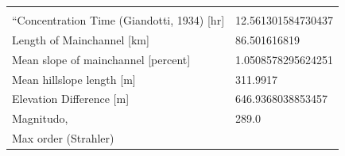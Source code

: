 \documentclass[11pt,]{article}
\begin{document}
\begin{longtable}[]{@{}ll@{}}
\begin{minipage}[t]{0.28\columnwidth}
\end{minipage}\tabularnewline
\begin{minipage}[t]{0.66\columnwidth}\raggedright\strut
``Concentration Time (Giandotti, 1934) {[}hr{]}\strut
\end{minipage} & \begin{minipage}[t]{0.28\columnwidth}\raggedright\strut
12.561301584730437\strut
\end{minipage}\tabularnewline
\begin{minipage}[t]{0.66\columnwidth}\raggedright\strut
Length of Mainchannel {[}km{]}\strut
\end{minipage} & \begin{minipage}[t]{0.28\columnwidth}\raggedright\strut
86.501616819\strut
\end{minipage}\tabularnewline
\begin{minipage}[t]{0.66\columnwidth}\raggedright\strut
Mean slope of mainchannel {[}percent{]}\strut
\end{minipage} & \begin{minipage}[t]{0.28\columnwidth}\raggedright\strut
1.0508578295624251\strut
\end{minipage}\tabularnewline
\begin{minipage}[t]{0.66\columnwidth}\raggedright\strut
Mean hillslope length {[}m{]}\strut
\end{minipage} & \begin{minipage}[t]{0.28\columnwidth}\raggedright\strut
311.9917\strut
\end{minipage}\tabularnewline
\begin{minipage}[t]{0.66\columnwidth}\raggedright\strut
Elevation Difference {[}m{]}\strut
\end{minipage} & \begin{minipage}[t]{0.28\columnwidth}\raggedright\strut
646.9368038853457\strut
\end{minipage}\tabularnewline
\begin{minipage}[t]{0.66\columnwidth}\raggedright\strut
Magnitudo,\strut
\end{minipage} & \begin{minipage}[t]{0.28\columnwidth}\raggedright\strut
289.0\strut
\end{minipage}\tabularnewline
\begin{minipage}[t]{0.66\columnwidth}\raggedright\strut
Max order (Strahler)\strut
\end{minipage} & \begin{minipage}[t]{0.28\columnwidth}\raggedright\strut

\end{minipage}
\end{longtable}
\end{document}
